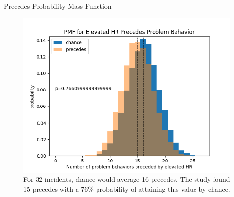 \documentclass[final]{beamer}
\newlength{\onecolwid}
\newlength{\twocolwid}
\begin{document}
\begin{frame}[t]
\begin{columns}[t]
\begin{column}{\twocolwid}
\begin{columns}[t,totalwidth=\twocolwid]
\begin{column}{\onecolwid}

\begin{block}{Precedes Probability Mass Function}
	
	\begin{figure}
		\includegraphics[width=0.8\linewidth]{Predict.png}
		\caption{For 32 incidents, chance would average 16 precedes. The study found 15 precedes with a 76\% probability of attaining this value by chance.}
	\end{figure}
	
\end{block}


\end{column} %

\end{columns} %


\begin{columns}[t,totalwidth=\twocolwid] %

\begin{column}{\onecolwid} %


\end{column} %

\begin{column}{\onecolwid} %


\end{column}
\end{columns}
\end{column}
\end{columns}
\end{frame}
\end{document}
